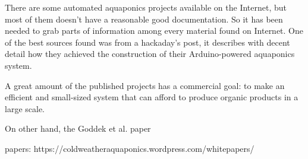 There are some automated aquaponics projects available on the Internet,
but most of them doesn't have a reasonable good documentation.
So it has been needed to grab parts of information among every material found on Internet.
One of the best sources found was from a hackaday's post,
it describes with decent detail how they achieved the construction of their Arduino-powered aquaponics system.

A great amount of the published projects has a commercial goal:
to make an efficient and small-sized system that can afford to produce organic products in a large scale.

On other hand, the Goddek et al. paper 

papers: https://coldweatheraquaponics.wordpress.com/whitepapers/
